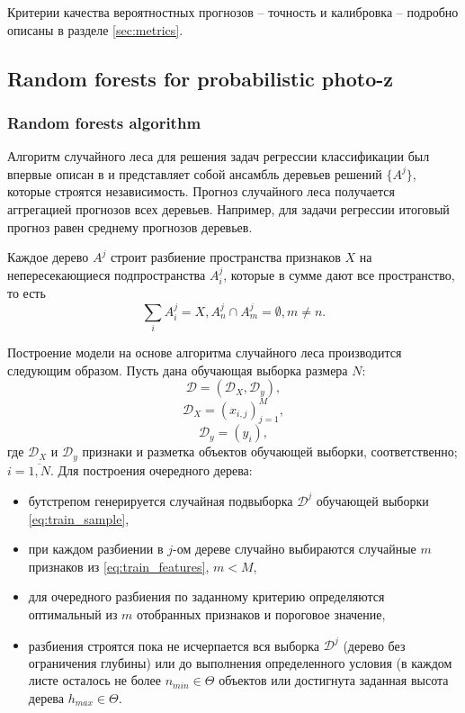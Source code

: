 \documentclass[fleqn,usenatbib]{mnras}
\begin{document}
Критерии качества вероятностных прогнозов -- точность и калибровка -- подробно описаны в разделе \ref{sec:metrics}.

\subsection{Random forests for probabilistic photo-z}

\subsubsection{Random forests algorithm}
Алгоритм случайного леса для решения задач регрессии классификации был впервые описан в \citep{2001MachL..45....5B} и представляет собой ансамбль деревьев решений $\{A^j\}$, которые строятся независимость. Прогноз случайного леса получается аггрегацией прогнозов всех деревьев. Например, для задачи регрессии итоговый прогноз равен среднему прогнозов деревьев.

Каждое дерево $A^j$ строит разбиение пространства признаков $X$ на непересекающиеся подпространства $A^j_i$, которые в сумме дают все пространство, то есть
\begin{equation}
    \sum_i A^j_i = X, A^j_n \cap A^j_m = \emptyset, m \neq n.
\end{equation}

Построение модели на основе алгоритма случайного леса производится следующим образом. Пусть дана обучающая выборка размера $N$:
\begin{equation}\label{eq:train_sample}
    \mathcal{D} = (\mathcal{D}_X, \mathcal{D}_y),
\end{equation}
\begin{equation}\label{eq:train_features}
    \mathcal{D}_X = (x_{i,j})_{j=1}^M,
\end{equation}
\begin{equation}\label{eq:train_target}
    \mathcal{D}_y = (y_i),
\end{equation}
где $\mathcal{D}_X$ и $\mathcal{D}_y$ признаки и разметка объектов обучающей выборки, соответственно; $i=\overline{1, N}$. Для построения очередного дерева:
\begin{itemize}
    \item бутстрепом генерируется случайная подвыборка $\mathcal{D}^j$ обучающей выборки \eqref{eq:train_sample},
    \item при каждом разбиении в $j$-ом дереве случайно выбираются случайные $m$ признаков из \eqref{eq:train_features}, $m < M$,
    \item для очередного разбиения по заданному критерию определяются оптимальный из $m$ отобранных признаков и пороговое значение,
    \item разбиения строятся пока не исчерпается вся выборка $\mathcal{D}^j$ (дерево без ограничения глубины) или до выполнения определенного условия (в каждом листе осталось не более $n_{min} \in \Theta$ объектов или достигнута заданная высота дерева $h_{max} \in \Theta$.
\end{itemize}
\end{document}
